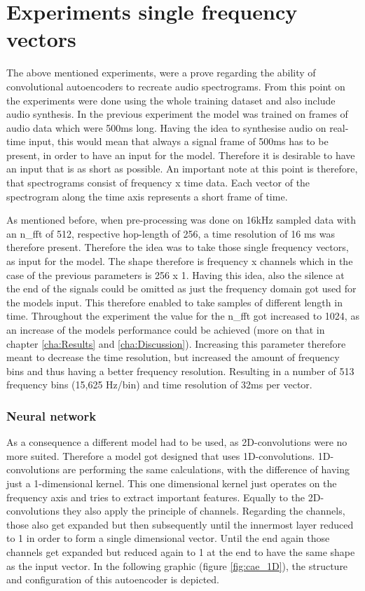 \section{Experiments single frequency vectors}
The above mentioned experiments, were a prove regarding the ability of convolutional autoencoders to recreate audio spectrograms. From this point on the experiments were done using the whole training dataset and also include audio synthesis. In the previous experiment the model was trained on frames of audio data which were 500ms long. Having the idea to synthesise audio on real-time input, this would mean that always a signal frame of 500ms has to be present, in order to have an input for the model. Therefore it is desirable to have an input that is as short as possible. An important note at this point is therefore, that spectrograms consist of frequency x time data. Each vector of the spectrogram along the time axis represents a short frame of time. 

As mentioned before, when pre-processing was done on 16kHz sampled data with an n\_fft of 512, respective hop-length of 256, a time resolution of 16 ms was therefore present. Therefore the idea was to take those single frequency vectors, as input for the model. The shape therefore is frequency x channels which in the case of the previous parameters is 256 x 1. Having this idea, also the silence at the end of the signals could be omitted as just the frequency domain got used for the models input. This therefore enabled to take samples of different length in time. Throughout the experiment the value for the n\_fft got increased to 1024, as an increase of the models performance could be achieved (more on that in chapter \ref{cha:Results} and \ref{cha:Discussion}). Increasing this parameter therefore meant to decrease the time resolution, but increased the amount of frequency bins and thus having a better frequency resolution. Resulting in a number of 513 frequency bins (15,625 Hz/bin) and time resolution of 32ms per vector.


\subsubsection{Neural network}
As a consequence a different model had to be used, as 2D-convolutions were no more suited. Therefore a model got designed that uses 1D-convolutions. 1D-convolutions are performing the same calculations, with the difference of having just a 1-dimensional kernel. This one dimensional kernel just operates on the frequency axis and tries to extract important features. Equally to the 2D-convolutions they also apply the principle of channels. Regarding the channels, those also get expanded but then subsequently until the innermost layer reduced to 1 in order to form a single dimensional vector. Until the end again those channels get expanded but reduced again to 1 at the end to have the same shape as the input vector. In the following graphic (figure \ref{fig:cae_1D}), the structure and configuration of this autoencoder is depicted. 

